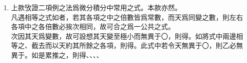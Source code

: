 \begin{enumerate} [label={第\chinese*款},nolistsep]
	\item 上款攷證二項例之法爲微分積分中常用之式。本款亦然。\\
	凡遇相等之式如\CJKmove {}者，若其各項之中之倍數皆爲常數，而天爲同變之數，則左右各項中之各倍數必挨次相同，故可合之爲一公共之式。\\
	次因其天爲變數，故可設想其天變至極小而無異于〇，則得\CJKmove。如將式中兩邊相等之\CJKmove、\CJKmove 截去而以天約其所餘之各項，則得\CJKmove。此式中若令天無異于〇，則乙必無異于。如是累推之，則得\CJKmove、\CJKmove、\CJKmove、\CJKmove、\CJKmove
\end{enumerate}
